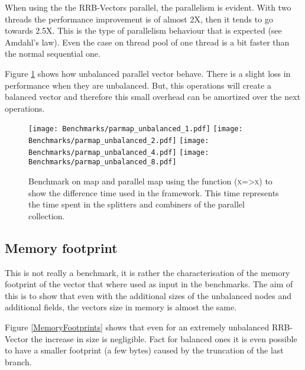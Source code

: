 When using the the RRB-Vectors parallel, the parallelism is evident. With two threads the performance improvement is of almost 2X, then it tends to go towards 2.5X. This is the type of parallelism behaviour that is expected (see Amdahl's law\cite{TODO}). Even the case on thread pool of one thread is a bit faster than the normal sequential one.

\FloatBarrier

Figure \ref{ParallelUnbalancedBenchmarks} shows how unbalanced parallel vector behave. There is a slight loss in performance when they are unbalanced. But, this operations will create a balanced vector and therefore this small overhead can be amortized over the next operations.

\begin{figure}[h!]
  \centering
  \texttt{[image: Benchmarks/parmap\_unbalanced\_1.pdf]}
  \texttt{[image: Benchmarks/parmap\_unbalanced\_2.pdf]}
  \texttt{[image: Benchmarks/parmap\_unbalanced\_4.pdf]}
  \texttt{[image: Benchmarks/parmap\_unbalanced\_8.pdf]}
  \caption{Benchmark on map and parallel map using the function (\textsc{x=>x}) to show the difference time used in the framework. This time represents the time spent in the splitters and combiners of the parallel collection.}
  \label{ParallelUnbalancedBenchmarks}
\end{figure}

\FloatBarrier

\subsection{Memory footprint}
This is not really a benchmark, it is rather the characterisation of the memory footprint of the vector that where used as input in the benchmarks. The aim of this is to show that even with the additional sizes of the unbalanced nodes and additional fields, the vectors size in memory is almost the same.

Figure \ref{MemoryFootprints} shows that even for an extremely unbalanced RRB-Vector the increase in size is negligible. Fact for balanced ones it is even possible to have a smaller footprint (a few bytes) caused by the truncation of the last branch. 

